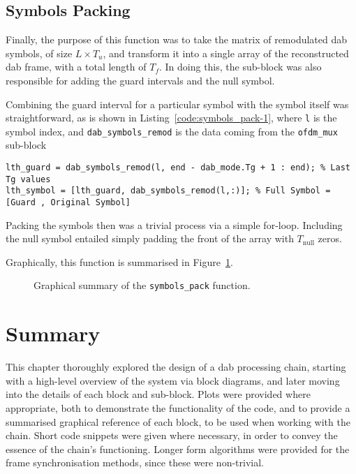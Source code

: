 \documentclass[class=report,11pt,crop=false]{standalone}
\begin{document}
\subsection{Symbols Packing \label{subsect:dab-proc_symbols-pack}}
Finally, the purpose of this function was to take the matrix of remodulated \gls{dab} symbols, of size \(L \times T_u\), and transform it into a single array of the reconstructed \gls{dab} frame, with a total length of \(T_f\). In doing this, the sub-block was also responsible for adding the guard intervals and the null symbol.

Combining the guard interval for a particular symbol with the symbol itself was straightforward, as is shown in Listing~\ref{code:symbols_pack-1}, where \texttt{l} is the symbol index, and \texttt{dab\_symbols\_remod} is the data coming from the \texttt{ofdm\_mux} sub-block

\begin{lstlisting}[caption={},label={code:symbols_pack-1}]
lth_guard = dab_symbols_remod(l, end - dab_mode.Tg + 1 : end); % Last Tg values
lth_symbol = [lth_guard, dab_symbols_remod(l,:)]; % Full Symbol = [Guard , Original Symbol]
\end{lstlisting}

Packing the symbols then was a trivial process via a simple for-loop. Including the null symbol entailed simply padding the front of the array with \(T_\mathrm{null}\) zeros.

Graphically, this function is summarised in Figure~\ref{fig:symbols_pack}.

\begin{figure}[htbp]
  \centering
  \captionsetup{type=figure}
  \def\svgwidth{\linewidth}
  { %
  }
  \caption{Graphical summary of the \texttt{symbols\_pack} function.}
  \label{fig:symbols_pack}
\end{figure}

\section{Summary}
This chapter thoroughly explored the design of a \gls{dab} processing chain, starting with a high-level overview of the system via block diagrams, and later moving into the details of each block and sub-block. Plots were provided where appropriate, both to demonstrate the functionality of the code, and to provide a summarised graphical reference of each block, to be used when working with the chain. Short code snippets were given where necessary, in order to convey the essence of the chain's functioning. Longer form algorithms were provided for the frame synchronisation methods, since these were non-trivial.

\ifstandalone

\printnoidxglossary[type=\acronymtype,nonumberlist]
\fi
\end{document}

